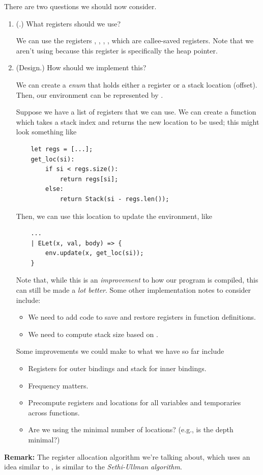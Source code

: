 \documentclass[letterpaper]{article}
\begin{document}
\bigskip 

There are two questions we should now consider.
\begin{enumerate}
    \item (.) What registers should we use?
    \begin{mdframed}
        We can use the registers , , , , which are callee-saved registers. Note that we aren't using  because this register is specifically the heap pointer.
    \end{mdframed}
    \item (Design.) How should we implement this?
    \begin{mdframed}
        We can create a  \emph{enum} that holds either a register or a stack location (offset). Then, our environment can be represented by .

        \bigskip 

        Suppose we have a list of registers that we can use. We can create a  function which takes a stack index and returns the new location to be used; this might look something like 
        \begin{verbatim}
    let regs = [...];
    get_loc(si):
        if si < regs.size():
            return regs[si];
        else:
            return Stack(si - regs.len());\end{verbatim}
        Then, we can use this location to update the environment, like 
        \begin{verbatim}
    ... 
    | ELet(x, val, body) => {
        env.update(x, get_loc(si));
    }\end{verbatim}
        Note that, while this is an \emph{improvement} to how our program is compiled, this can still be made a \emph{lot better}. Some other implementation notes to consider include: 
        \begin{itemize}
            \item We need to add code to save and restore registers in function definitions.
            \item We need to compute stack size based on .
        \end{itemize}
        Some improvements we could make to what we have so far include 
        \begin{itemize}
            \item Registers for outer bindings and stack for inner bindings. 
            \item Frequency matters. 
            \item Precompute registers and locations for all variables and temporaries across functions. 
            \item Are we using the minimal number of locations? (e.g., is the depth minimal?)
        \end{itemize}
    \end{mdframed} 
\end{enumerate}
\textbf{Remark:} The register allocation algorithm we're talking about, which uses an idea similar to , is similar to the \emph{Sethi-Ullman algorithm}.
\end{document}

